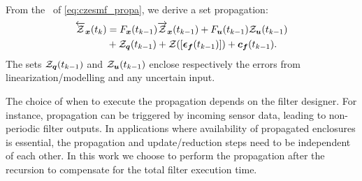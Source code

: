 \documentclass{ifacconf}
\begin{document}
From the \linearinclusion\ of \eqref{eq:czesmf_propa}, we derive a set propagation:
\begin{align}
  \overleftarrow{\mathcal{Z}}_{\boldsymbol{x}} (t_k) &= 
                      F_{\boldsymbol{x}}(t_{k-1}) \overrightarrow{\mathcal{Z}}_{\boldsymbol{x}} (t_{k-1})
                      +F_{\boldsymbol{u}}(t_{k-1}) \mathcal{Z}_{\boldsymbol{u}} (t_{k-1}) \nonumber \\
                    &
                      + \mathcal{Z}_{\boldsymbol{q}} (t_{k-1})
                      + \mathcal{Z}([\boldsymbol{\epsilon}_{\boldsymbol{f}}(t_{k-1})])
                      + \boldsymbol{c}_{\boldsymbol{f}} (t_{k-1}).
                      \label{eq:cz_propagation}
\end{align}
The sets $\mathcal{Z}_{\boldsymbol{q}}(t_{k-1})$ and $\mathcal{Z}_{\boldsymbol{u}}(t_{k-1})$ enclose respectively the errors from  linearization/modelling and any uncertain input.



The choice of when to execute the propagation depends on the filter designer.
For instance, propagation can be triggered by incoming sensor data, leading to non-periodic filter outputs.
In applications where availability of propagated enclosures is essential, the propagation and update/reduction steps need to be independent of each other.
In this work we choose to perform the propagation after the recursion to compensate for the total filter execution time. %
\end{document}
